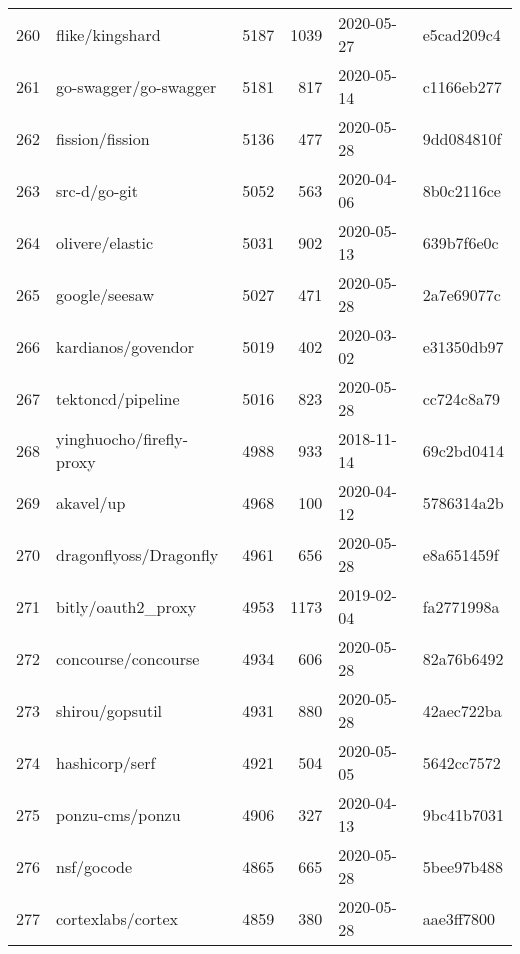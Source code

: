 \begin{longtable}{llrrll}
    260 &                                    flike/kingshard &   5187 &   1039 & 2020-05-27 &  e5cad209c4 \\
    261 &                              go-swagger/go-swagger &   5181 &    817 & 2020-05-14 &  c1166eb277 \\
    262 &                                    fission/fission &   5136 &    477 & 2020-05-28 &  9dd084810f \\
    263 &                                       src-d/go-git &   5052 &    563 & 2020-04-06 &  8b0c2116ce \\
    264 &                                    olivere/elastic &   5031 &    902 & 2020-05-13 &  639b7f6e0c \\
    265 &                                      google/seesaw &   5027 &    471 & 2020-05-28 &  2a7e69077c \\
    266 &                                 kardianos/govendor &   5019 &    402 & 2020-03-02 &  e31350db97 \\
    267 &                                  tektoncd/pipeline &   5016 &    823 & 2020-05-28 &  cc724c8a79 \\
    268 &                           yinghuocho/firefly-proxy &   4988 &    933 & 2018-11-14 &  69c2bd0414 \\
    269 &                                          akavel/up &   4968 &    100 & 2020-04-12 &  5786314a2b \\
    270 &                             dragonflyoss/Dragonfly &   4961 &    656 & 2020-05-28 &  e8a651459f \\
    271 &                                 bitly/oauth2\_proxy &   4953 &   1173 & 2019-02-04 &  fa2771998a \\
    272 &                                concourse/concourse &   4934 &    606 & 2020-05-28 &  82a76b6492 \\
    273 &                                    shirou/gopsutil &   4931 &    880 & 2020-05-28 &  42aec722ba \\
    274 &                                     hashicorp/serf &   4921 &    504 & 2020-05-05 &  5642cc7572 \\
    275 &                                    ponzu-cms/ponzu &   4906 &    327 & 2020-04-13 &  9bc41b7031 \\
    276 &                                         nsf/gocode &   4865 &    665 & 2020-05-28 &  5bee97b488 \\
    277 &                                  cortexlabs/cortex &   4859 &    380 & 2020-05-28 &  aae3ff7800 \\

\end{longtable}
